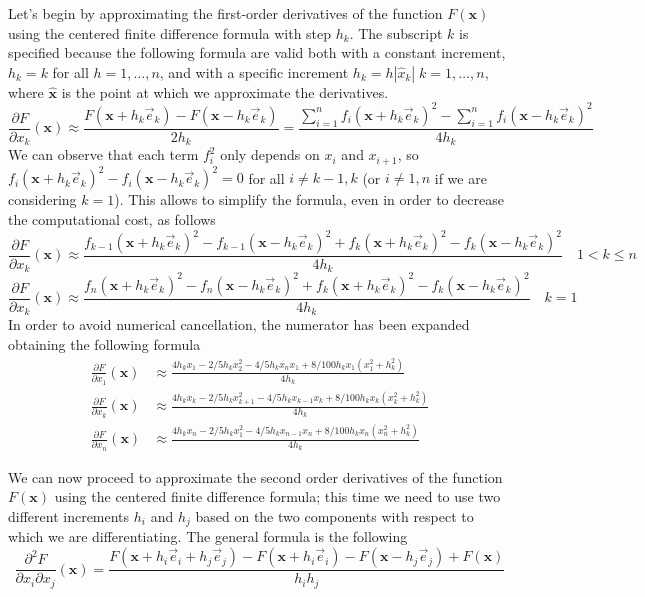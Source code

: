 Let's begin by approximating the first-order derivatives of the function $F(\mathbf{x})$ using the centered finite difference formula with step $h_k$. The subscript $k$ is specified because the following formula are valid both with a constant increment, $h_k = k$ for all $h = 1, \dots, n$, and with a specific increment $h_k = h |\hat{x}_k| \; k= 1, \dots, n$, where $\mathbf{\hat{x}}$ is the point at which we approximate the derivatives.
$$ \frac{\partial F }{\partial x_k} (\mathbf{x}) \approx \frac{F(\mathbf{x} + h_k \vec{e}_k) - F(\mathbf{x} - h_k \vec{e}_k)}{2h_k} = 
\frac{\sum_{i = 1}^{n} f_i(\mathbf{x} + h_k \vec{e}_k)^2 - \sum_{i = 1}^{n} f_i(\mathbf{x} - h_k \vec{e}_k)^2}{4h_k}$$
We can observe that each term $f_i^2$ only depends on $x_i$ and $x_{i+1}$, so $f_i(\mathbf{x} + h_k\vec{e}_k)^2 - f_i(\mathbf{x} - h_k\vec{e}_k)^2 = 0$ for all $i \neq k-1, k$ (or $i \neq 1,n$ if we are considering $k = 1$). 
This allows to simplify the formula, even in order to decrease the computational cost, as follows
$$\frac{\partial F }{\partial x_k} (\mathbf{x}) \approx  \frac{f_{k-1}(\mathbf{x} + h_k\vec{e}_k)^2 - f_{k-1}(\mathbf{x} - h_k\vec{e}_k)^2 + f_{k}(\mathbf{x} + h_k\vec{e}_k)^2 - f_{k}(\mathbf{x} - h_k\vec{e}_k)^2}{4h_k}  \quad 1 < k \leq n$$
$$\frac{\partial F }{\partial x_k} (\mathbf{x}) \approx  \frac{f_{n}(\mathbf{x} + h_k\vec{e}_k)^2 - f_{n}(\mathbf{x} - h_k\vec{e}_k)^2 + f_{k}(\mathbf{x} + h_k\vec{e}_k)^2 - f_{k}(\mathbf{x} - h_k\vec{e}_k)^2}{4h_k}  \quad k = 1$$
In order to avoid numerical cancellation, the numerator has been expanded obtaining the following formula
\begin{align*}
    \frac{\partial F }{\partial x_1} (\mathbf{x}) & \approx \frac{4h_k x_1 - 2/5 h_k x_2^2 - 4/5 h_k x_n x_1 + 8/100 h_k x_1 (x_1^2 + h_k^2)}{4h_k} \\
    \frac{\partial F }{\partial x_k} (\mathbf{x}) & \approx \frac{4h_k x_k - 2/5 h_k x_{k+1}^2 - 4/5 h_k x_{k-1} x_k + 8/100 h_k x_k (x_k^2 + h_k^2)}{4h_k} \\
    \frac{\partial F }{\partial x_n} (\mathbf{x}) & \approx \frac{4h_k x_n - 2/5 h_k x_{1}^2 - 4/5 h_k x_{n-1} x_n + 8/100 h_k x_n (x_n^2 + h_k^2)}{4h_k}
\end{align*}


We can now proceed to approximate the second order derivatives of the function $F(\mathbf{x})$ using the centered finite difference formula; this time we need to use two different increments $h_i$ and $h_j$ based on the two components with respect to which we are differentiating.
The general formula is the following
$$ \frac{\partial^2 F}{\partial x_i \partial x_j} (\mathbf{x})  = \frac{F(\mathbf{x} + h_i \vec{e}_i + h_j \vec{e}_j) - F(\mathbf{x} + h_i \vec{e}_i) - F(\mathbf{x} - h_j \vec{e}_j) + F(\mathbf{x})}{h_i h_j}$$

